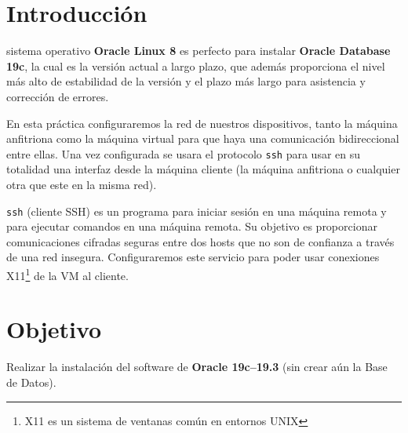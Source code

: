 \documentclass{IEEEtran}
\begin{document}
\author{Cristian Romero Andrade}
\title{\tituloPractica{}}

\author{}

\date{ }



\maketitle{}
\tableofcontents{}

\dotfill{}

\begin{abstract}
La presente muestra paso a paso la instalación del gestor de bases de datos
\textbf{Oracle Database 19c} en una máquina virtual con \textbf{Oracle Linux 8}.
\end{abstract}

\dotfill{}

\section{Introducción}\label{sec:introduccion}
 sistema operativo \textbf{Oracle Linux 8} es perfecto
para instalar \textbf{Oracle Database 19c}, la cual  es la versión actual a largo plazo,
que además proporciona el nivel más alto de estabilidad de la versión y el plazo más
largo para asistencia y corrección de errores.

En esta práctica configuraremos la red de nuestros dispositivos, tanto la máquina anfitriona
como la máquina virtual para que haya una comunicación bidireccional entre ellas. Una vez
configurada se usara el protocolo \texttt{ssh} para usar en su totalidad una interfaz desde
la máquina cliente (la máquina anfitriona o cualquier otra que este en la misma red).

\texttt{ssh} (cliente SSH) es un programa para iniciar sesión en una máquina remota y
para ejecutar comandos en una máquina remota. Su objetivo es proporcionar comunicaciones
cifradas seguras entre dos hosts que no son de confianza a través de una red insegura.
Configuraremos este servicio para poder usar conexiones X11\footnote{X11 es un sistema de ventanas común en entornos UNIX} de la VM al cliente.



\section{Objetivo}\label{sec:objetivo}
Realizar la instalación del software de \textbf{Oracle 19c--19.3} (sin crear aún
la Base de Datos).
\end{document}
